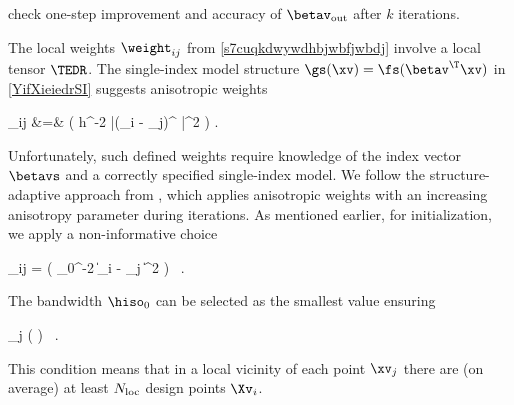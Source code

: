 {\color{blue} check one-step improvement and accuracy of \( \betav_{\outp} \) after \( k \) iterations.}



\label{SanisoSI}
The local weights \( \weight_{ij} \) from \eqref{s7cuqkdwywdhbjwbfjwbdj} involve a local tensor \( \TEDR \).
The single-index model structure \( \gs(\xv) = \fs(\betav^{\T} \xv) \) in \eqref{YifXieiedrSI} suggests
anisotropic weights
\begin{EQA}
	\weights_{ij}
	&=&
	\Kern\bigl( h^{-2} |(\Xv_{i} - \xv_{j})^{\T} \betavs|^{2} \bigr) .
\label{s7cuqkdwywdhbjwbfjwbdji}
\end{EQA}
Unfortunately, such defined weights require knowledge of the index vector \( \betavs \) and 
a correctly specified single-index model. 
We follow the structure-adaptive approach from \cite{HJPS}, which applies anisotropic weights 
with an increasing anisotropy parameter during iterations.
As mentioned earlier, for initialization, we apply a non-informative choice 
\begin{EQA}[c]
	\weight_{ij} = \Kern\bigl( \hiso_{0}^{-2} \| \Xv_{i} - \xv_{j} \|^{2} \bigr) 
	\, .
\end{EQA}
The bandwidth \( \hiso_{0} \) can be selected as the smallest value ensuring
\begin{EQA}[c]
	\sum_{j \in \JJJ} \sumi \Kern\Bigl(  \Bigr)
	\geq 
	\nmin
	\, .
\label{jhgiverkytde4w34etycj}
\end{EQA}
This condition means that in a local vicinity of each point \( \xv_{j} \) there are (on average) 
at least \( N_{\operatorname{loc}} \) design points \( \Xv_{i} \).

